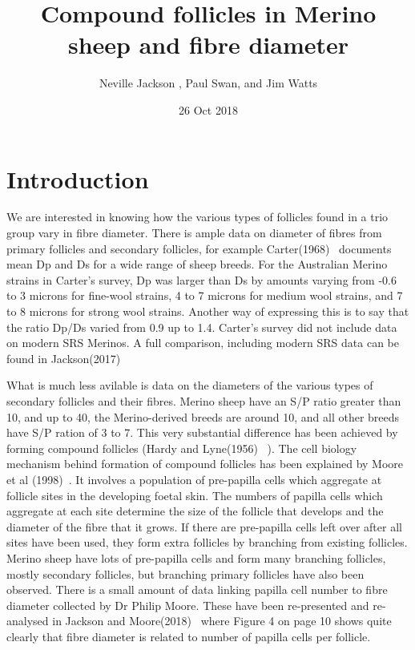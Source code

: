 \documentclass[titlepage]{article}  %
\title{ Compound follicles in Merino sheep and fibre diameter}
\author{Neville Jackson , Paul Swan, and Jim Watts}
\date{26 Oct 2018}
\begin{document}
 
 
\maketitle      
\tableofcontents


\clearpage
\section{Introduction} 
We are interested in knowing how the various types of follicles found in a trio group vary in fibre diameter. There is ample data on diameter of fibres from primary follicles and secondary follicles, for example Carter(1968)~\cite{cart:68} documents mean Dp and Ds for a wide range of sheep breeds. For the Australian Merino strains in Carter's survey, Dp was larger than Ds by amounts varying from -0.6 to 3 microns for fine-wool strains, 4 to 7 microns for medium wool strains, and 7 to 8 microns for strong wool strains. Another way of expressing this is to say that the ratio Dp/Ds varied from 0.9 up to 1.4. Carter's survey did not include data on modern SRS Merinos. A full comparison, including modern SRS data can be found in Jackson(2017)~\cite{jack:17b}

What is much less avilable is data on the diameters of the various types of secondary follicles and their fibres.  Merino sheep have an S/P ratio greater than 10, and up to 40, the Merino-derived breeds are around 10, and all other breeds have S/P ration of 3 to 7. This very substantial difference has been achieved by forming compound follicles (Hardy and Lyne(1956)~\cite{hard:56} ). The cell biology mechanism behind formation of compound follicles has been explained by Moore et al (1998)~\cite{moor:98}. It involves a population of pre-papilla cells which aggregate at follicle sites in the developing foetal skin. The numbers of papilla cells which aggregate at each site determine the size of the follicle that develops and the diameter of the fibre that it grows. If there are pre-papilla cells left over after all sites have been used, they form extra follicles by branching from existing follicles. Merino sheep have lots of pre-papilla cells and form many branching follicles, mostly secondary follicles, but branching primary follicles have also been observed. There is a small amount of data linking papilla cell number to fibre diameter collected by Dr Philip Moore. These have been re-presented and re-analysed in Jackson and Moore(2018)~\cite{jamo:18} where Figure 4 on page 10 shows quite clearly that fibre diameter is related to number of papilla cells per follicle.
\end{document}
